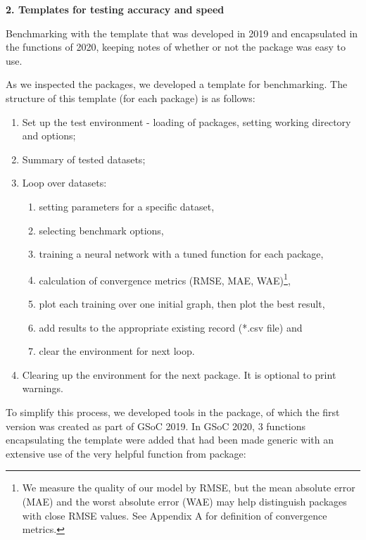 \textbf{2. Templates for testing accuracy and speed}

Benchmarking with the template that was developed in 2019 and
encapsulated in the functions of 2020, keeping notes of whether or not
the package was easy to use.

As we inspected the packages, we developed a template for benchmarking.
The structure of this template (for each package) is as follows:

\begin{enumerate}
\def\labelenumi{\arabic{enumi}.}
\tightlist
\item
  Set up the test environment - loading of packages, setting working
  directory and options;
\item
  Summary of tested datasets;
\item
  Loop over datasets:

  \begin{enumerate}
  \def\labelenumii{\alph{enumii}.}
  \tightlist
  \item
    setting parameters for a specific dataset,
  \item
    selecting benchmark options,
  \item
    training a neural network with a tuned function for each package,
  \item
    calculation of convergence metrics (RMSE, MAE, WAE)\footnote{We
      measure the quality of our model by RMSE, but the mean absolute
      error (MAE) and the worst absolute error (WAE) may help
      distinguish packages with close RMSE values. See Appendix A for
      definition of convergence metrics.},
  \item
    plot each training over one initial graph, then plot the best
    result,
  \item
    add results to the appropriate existing record (*.csv file) and
  \item
    clear the environment for next loop.
  \end{enumerate}
\item
  Clearing up the environment for the next package. It is optional to
  print warnings.
\end{enumerate}

To simplify this process, we developed tools in the 
package, of which the first version was created as part of GSoC 2019. In
GSoC 2020, 3 functions encapsulating the template were added that had
been made generic with an extensive use of the very helpful
 function from  package:

